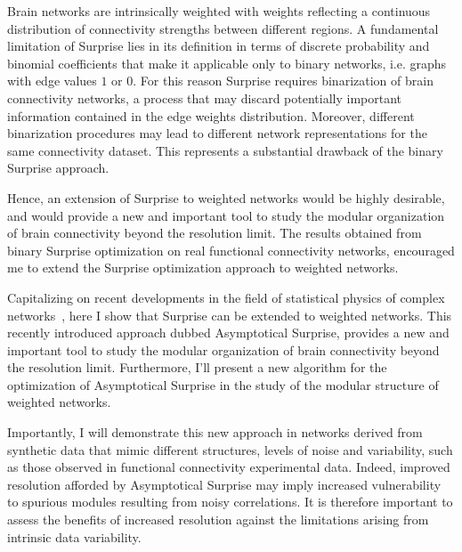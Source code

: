 Brain networks are intrinsically weighted with weights reflecting a continuous distribution of connectivity strengths between different regions.
A fundamental limitation of Surprise lies in its definition in terms of discrete probability and binomial coefficients that make it applicable only to binary networks, i.e. graphs with edge values $1$ or $0$.
For this reason Surprise requires binarization of brain connectivity networks, a process that may discard potentially important information contained in the edge weights distribution. 
Moreover, different binarization procedures may lead to different network representations for the same connectivity dataset.
This represents a substantial drawback of the binary Surprise approach.

Hence, an extension of Surprise to weighted networks would be highly desirable, and would provide a new and important tool to study the modular organization of brain connectivity beyond the resolution limit.
The results obtained from binary Surprise optimization on real functional connectivity networks, encouraged me to extend the Surprise optimization approach to weighted networks.

Capitalizing on recent developments in the field of statistical physics of complex networks~\cite{traag2015}, here I show that Surprise can be extended to weighted networks. This recently introduced approach dubbed Asymptotical Surprise, provides a new and important tool to study the modular organization of brain connectivity beyond the resolution limit.
Furthermore, I'll present a new algorithm for the optimization of Asymptotical Surprise in the study of the modular structure of weighted networks.

Importantly, I will demonstrate this new approach in networks derived from synthetic data that mimic different structures, levels of noise and variability, such as those observed in functional connectivity experimental data.
Indeed, improved resolution afforded by Asymptotical Surprise may imply increased vulnerability to spurious modules resulting from noisy correlations.
It is therefore important to assess the benefits of increased resolution against the limitations arising from intrinsic data variability. 

